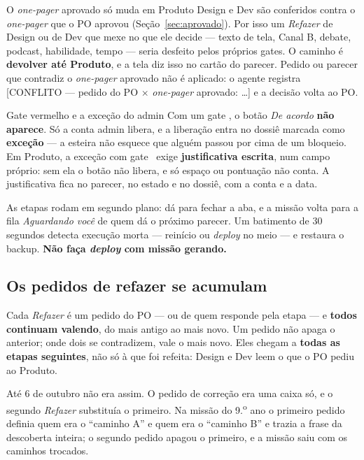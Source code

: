 \documentclass[11pt,a4paper]{article}
\newcommand{\cod}[1]{{\ttfamily\small #1}}
\newcommand{\bolinha}[1]{\tikz[baseline=-0.5ex]{\fill[#1] (0,0) circle (0.33em);}}
\newcommand{\statusVermelho}{\bolinha{sinalVermelho}}
\begin{document}
\begin{caixaNorma}{O \emph{one-pager} aprovado só muda em Produto}
Design e Dev são conferidos contra o \emph{one-pager} que o PO aprovou (Seção~\ref{sec:aprovado}). Por isso um \emph{Refazer} de Design ou de Dev que mexe no que ele decide --- texto de tela, Canal B, debate, podcast, habilidade, tempo --- seria desfeito pelos próprios gates. O caminho é \textbf{devolver até Produto}, e a tela diz isso no cartão do parecer. Pedido ou parecer que contradiz o \emph{one-pager} aprovado não é aplicado: o agente registra \cod{[CONFLITO — pedido do PO $\times$ \emph{one-pager} aprovado: \ldots]} e a decisão volta ao PO.
\end{caixaNorma}

\begin{caixaGuardrail}{Gate vermelho e a exceção do admin}
Com um gate \statusVermelho, o botão \emph{De acordo} \textbf{não aparece}. Só a conta \cod{admin} libera, e a liberação entra no dossiê marcada como \textbf{exceção} --- a esteira não esquece que alguém passou por cima de um bloqueio. Em Produto, a exceção com gate \statusVermelho\ exige \textbf{justificativa escrita}, num campo próprio: sem ela o botão não libera, e só espaço ou pontuação não conta. A justificativa fica no parecer, no estado e no dossiê, com a conta e a data.

As etapas rodam em segundo plano: dá para fechar a aba, e a missão volta para a fila \emph{Aguardando você} de quem dá o próximo parecer. Um batimento de 30 segundos detecta execução morta --- reinício ou \emph{deploy} no meio --- e restaura o backup. \textbf{Não faça \emph{deploy} com missão gerando.}
\end{caixaGuardrail}

\subsection{Os pedidos de refazer se acumulam}
\label{sec:pedidos}

Cada \emph{Refazer} é um pedido do PO --- ou de quem responde pela etapa --- e \textbf{todos continuam valendo}, do mais antigo ao mais novo. Um pedido não apaga o anterior; onde dois se contradizem, vale o mais novo. Eles chegam a \textbf{todas as etapas seguintes}, não só à que foi refeita: Design e Dev leem o que o PO pediu ao Produto.

Até 6 de outubro não era assim. O pedido de correção era uma caixa só, e o segundo \emph{Refazer} substituía o primeiro. Na missão do 9.\textsuperscript{o} ano o primeiro pedido definia quem era o ``caminho A'' e quem era o ``caminho B'' e trazia a frase da descoberta inteira; o segundo pedido apagou o primeiro, e a missão saiu com os caminhos trocados.
\end{document}

